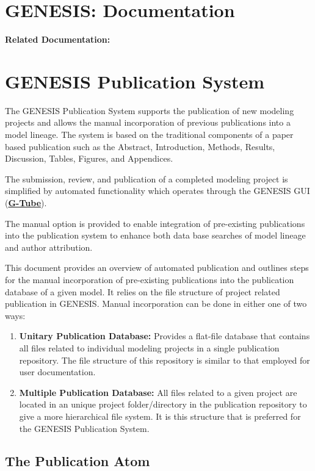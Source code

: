 \documentclass[12pt]{article}
\begin{document}
\section*{GENESIS: Documentation}

{\bf Related Documentation:}

\section*{GENESIS Publication System}

The GENESIS Publication System supports the publication of new modeling projects and allows the manual incorporation of previous publications into a model lineage. The system is based on the traditional components of a paper based publication such as the Abstract, Introduction, Methods, Results, Discussion, Tables, Figures, and Appendices.

The submission, review, and publication of a completed modeling project is simplified by automated functionality which operates through the GENESIS GUI (\href{../gtube/gtume.tex}{\bf G-Tube}). 

The manual option is provided to enable integration of pre-existing publications into the publication system to enhance both data base searches  of model lineage and author attribution.

This document provides an overview of automated publication and outlines steps for the manual incorporation of pre-existing publications into the publication database of a given model. It relies on the file structure of project related publication in GENESIS. Manual incorporation can be done in either one of two ways:
\begin{enumerate}
\item {\bf Unitary Publication Database:} Provides a flat-file database that contains all files related to individual modeling projects in a single publication repository. The file structure of this repository is similar to that employed for user documentation.
\item {\bf Multiple Publication Database:} All files related to a given project are located in an unique project folder/directory in the publication repository to give a more hierarchical file system. It is this structure that is preferred for the GENESIS Publication System.
\end{enumerate}

\subsection*{The Publication Atom}
\end{document}
